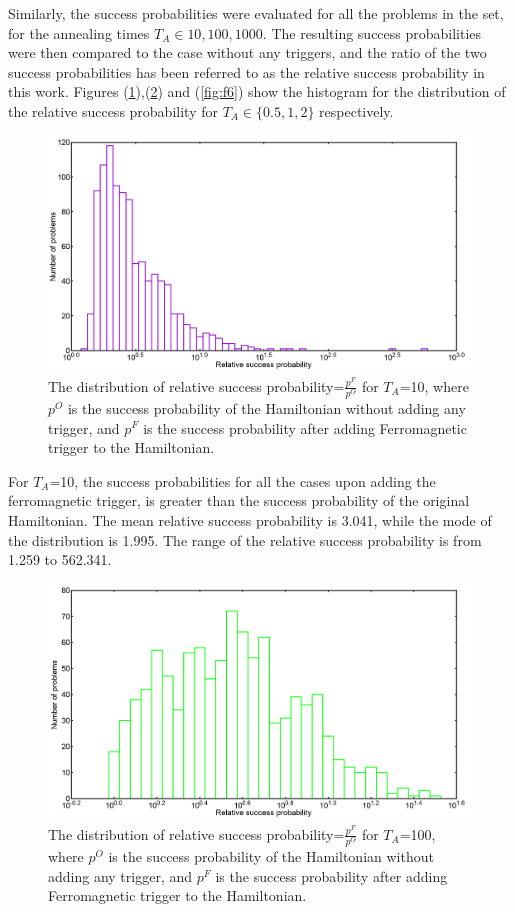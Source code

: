 \documentclass[12]{article}
\begin{document}
Similarly, the success probabilities were evaluated for all the problems in the set, for the annealing times $T_A \in {10,100,1000}$. The resulting success probabilities were then compared to the case without any triggers, and the ratio of the two success probabilities has been referred to as the relative success probability in this work. Figures (\ref{fig:f4}),(\ref{fig:f5}) and (\ref{fig:f6}) show the histogram for the distribution of the relative success probability for $T_A \in \{0.5,1,2\}$ respectively.
\begin{figure}[H]
\centering 
\includegraphics[scale=0.3]{Hist_s12_T10_F_g0.png}
\caption{The distribution of relative success probability=$\frac{p^F}{p^O}$ for $T_A$=10, where $p^O$ is the success probability of the Hamiltonian without adding any trigger, and $p^F$ is the success probability after adding Ferromagnetic trigger to the Hamiltonian.}
\label{fig:f4}
\end{figure}
For $T_A$=10, the success probabilities for all the cases upon adding the ferromagnetic trigger, is greater than the success probability of the original Hamiltonian. The mean relative success probability is 3.041, while the mode of the distribution is 1.995. The range of the relative success probability is from 1.259 to 562.341. 
\begin{figure}[H]
\centering 
\includegraphics[scale=0.3]{Hist_s12_T100_F_g0.png}
\caption{The distribution of relative success probability=$\frac{p^F}{p^O}$ for $T_A$=100, where $p^O$ is the success probability of the Hamiltonian without adding any trigger, and $p^F$ is the success probability after adding Ferromagnetic trigger to the Hamiltonian.}
\label{fig:f5}
\end{figure}
\end{document}
